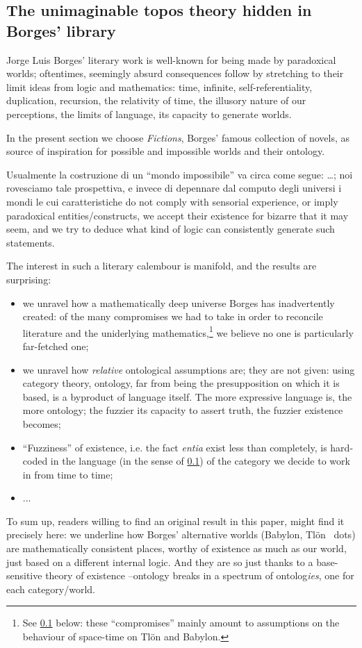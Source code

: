 \subsection{The unimaginable topos theory hidden in Borges' library}
Jorge Luis Borges' literary work is well-known for being made by paradoxical worlds; oftentimes, seemingly absurd consequences follow by stretching to their limit ideas from logic and mathematics: time, infinite, self-referentiality, duplication, recursion, the relativity of time, the illusory nature of our perceptions, the limits of language, its capacity to generate worlds. 

In the present section we choose \emph{Fictions}, Borges' famous collection of novels, as source of inspiration for possible and impossible worlds and their ontology.

Usualmente la costruzione di un ``mondo impossibile'' va circa come segue: \dots ; noi rovesciamo tale prospettiva, e invece di depennare dal computo degli universi i mondi le cui caratteristiche do not comply with sensorial experience, or imply paradoxical entities/constructs, we accept their existence for bizarre that it may seem, and we try to deduce what kind of logic can consistently generate such statements.

The interest in such a literary calembour is manifold, and the results are surprising:
\begin{itemize}
  \item we unravel how a mathematically deep universe Borges has inadvertently created: of the many compromises we had to take in order to reconcile literature and the uniderlying mathematics,\footnote{See \ref{} below: these ``compromises'' mainly amount to assumptions on the behaviour of space-time on Tl\"on and Babylon.} we believe no one is particularly far-fetched one;
  \item we unravel how \emph{relative} ontological assumptions are; they are not given: using category theory, ontology, far from being the presupposition on which it is based, is a byproduct of language itself. The more expressive language is, the more ontology; the fuzzier its capacity to assert truth, the fuzzier existence becomes;
  \item ``Fuzziness'' of existence, i.e. the fact \emph{entia} exist less than completely, is hard-coded in the language (in the sense of \ref{}) of the category we decide to work in from time to time;
  \item ...
\end{itemize}
To sum up, readers willing to find an original result in this paper, might find it precisely here: we underline how Borges' alternative worlds (Babylon, Tl\"on \ dots) are mathematically consistent places, worthy of existence as much as our world, just based on a different internal logic. And they are so just thanks to a base-sensitive theory of existence --ontology breaks in a spectrum of ontolog\emph{ies}, one for each category/world.

